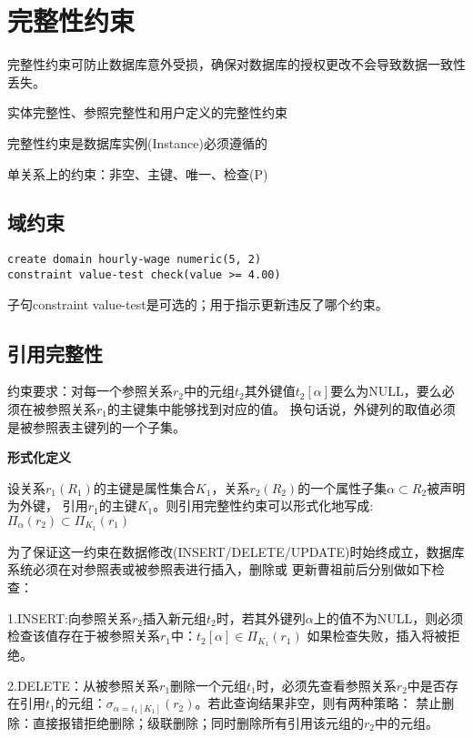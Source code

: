 \section{完整性约束}

完整性约束可防止数据库意外受损，确保对数据库的授权更改不会导致数据一致性丢失。

实体完整性、参照完整性和用户定义的完整性约束

完整性约束是数据库实例(Instance)必须遵循的

单关系上的约束：非空、主键、唯一、检查(P)

\subsection{域约束}

\begin{lstlisting}[style=sqlstyle]
create domain hourly-wage numeric(5, 2)
constraint value-test check(value >= 4.00)    
\end{lstlisting}

子句constraint value-test是可选的；用于指示更新违反了哪个约束。

\subsection{引用完整性}

约束要求：对每一个参照关系$r_2$中的元组$t_2$其外键值$t_2[\alpha]$要么为NULL，要么必须在被参照关系$r_1$的主键集中能够找到对应的值。
换句话说，外键列的取值必须是被参照表主键列的一个子集。

\noindent\textbf{形式化定义}

设关系$r_1(R_1)$的主键是属性集合$K_1$，关系$r_2(R_2)$的一个属性子集$\alpha\subset R_2$被声明为外键，
引用$r_1$的主键$K_1$。则引用完整性约束可以形式化地写成:
$\Pi_{\alpha}(r_2)\subset \Pi_{K_1}(r_1)$

为了保证这一约束在数据修改(INSERT/DELETE/UPDATE)时始终成立，数据库系统必须在对参照表或被参照表进行插入，删除或
更新曹祖前后分别做如下检查：

1.INSERT:向参照关系$r_2$插入新元组$t_2$时，若其外键列$\alpha$上的值不为NULL，则必须检查该值存在于被参照关系$r_1$中：$t_2[\alpha]\in \Pi_{K_1}(r_1)$
如果检查失败，插入将被拒绝。

2.DELETE：从被参照关系$r_1$删除一个元组$t_1$时，必须先查看参照关系$r_2$中是否存在引用$t_1$的元组：$\sigma_{\alpha=t_1[K_1]}(r_2)$。若此查询结果非空，则有两种策略：
禁止删除：直接报错拒绝删除；级联删除；同时删除所有引用该元组的$r_2$中的元组。

